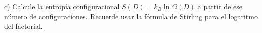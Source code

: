 c) Calcule la entropía configuracional $S(D)=k_B \ln \Omega(D)$ a partir de ese número de configuraciones. Recuerde usar la fórmula de Stirling para el logaritmo del factorial.
